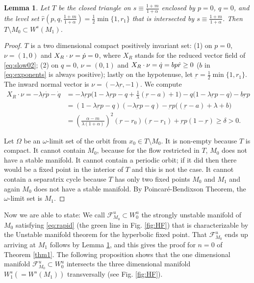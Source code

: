 \documentclass[usletter,11pt]{article}
\newtheorem{lemma}{Lemma}[section]
\theoremstyle{remark}
\begin{document}
\begin{lemma} \label{lem:T}
 Let $T$ be the closed triangle on $s\equiv \frac{1+m}{1+\alpha}$ enclosed by $p=0$, $q=0$, and the level set $\hat{r}(p,q,\frac{1+m}{1+\alpha})= \frac{1}{2}\min\{1,r_1\}$ that is intersected by $s\equiv \frac{1+m}{1+\alpha}$. 
 Then $T\setminus M_0 \subset W^s(M_1)$.
\end{lemma}
\begin{proof}
$T$ is a two dimensional compact positively invariant set: (1) on $p=0$, $\nu = (1,0)$ and $X_R\cdot\nobreak\nu = \dot{p}=0$, where $X_R$ stands for the reduced vector field of \eqref{eq:slow02};
 (2) on $q=0$, $\nu = (0,1)$ and $X_R\cdot\nobreak\nu=\dot{q} = bp\hat{r}\ge0$ ($b$ in \eqref{eq:exponents} is always positive); lastly on the hypotenuse, let $\underbar{r}=\frac{1}{2}\min\{1,r_1\}$. The inward normal vector is $\nu = (-\lambda\underbar{r}, -1)$. We compute
  \begin{align}
  X_R\cdot\nu=-\lambda\underbar{r}\dot{p} -\dot{q}&= -\lambda \underbar{r}p \Big(1-\lambda \underbar{r}p -q + \frac{1}{\lambda}(\underbar{r}-a)+1\Big) - q(1-\lambda \underbar{r}p -q\big) - b \underbar{r}p \nonumber\\
  &= (1-\lambda \underbar{r}p -q)(-\lambda \underbar{r}p -q) -\underbar{r}p\Big((\underbar{r}-a)+\lambda+b\Big)\nonumber\\
  &= \left(\frac{\alpha-m}{\lambda(1+\alpha)}\right)^2(\underbar{r}-r_0)(\underbar{r}-r_1)+\underbar{r}p(1-\underbar{r})\ge \delta>0. \label{eq:affine}
 \end{align}

Let $\Omega$ be an $\omega$-limit set of the orbit from $x_0\in T\setminus M_0$. It is non-empty because $T$ is compact.
 It cannot contain $M_0$, because for the flow restricted in $T$, $M_0$ does not have  a stable manifold. It cannot contain a periodic orbit; if it did then there would be a fixed point in the interior of $T$ and this is not the case. 
It cannot contain a separatrix cycle because $T$ has only two fixed points $M_0$ and $M_1$ and again $M_0$ does not have  a stable manifold.  By Poincar\'e-Bendixson Theorem, the $\omega$-limit set is $M_1$.
\end{proof}


Now we are able to state: We call $\mathcal{F}^u_{M_0}\subset W^u_0$ the strongly unstable manifold of $M_0$ satisfying \eqref{eq:rapid} (the green line in Fig. \ref{fig:HF}) that is characterizable by the Unstable manifold theorem for the hyperbolic fixed point. That $\mathcal{F}^u_{M_0}$ ends up arriving at $M_1$ 
follows by Lemma \ref{lem:T}, and this gives the proof for $n=0$ of Theorem \ref{thm1}. The following proposition shows that the one dimensional manifold $\mathcal{F}^u_{M_0}\subset W^u_0$ intersects the three dimensional manifold $W_1^s(=W^s(M_1))$ transversally (see Fig. \ref{fig:HF}).
\end{document}
